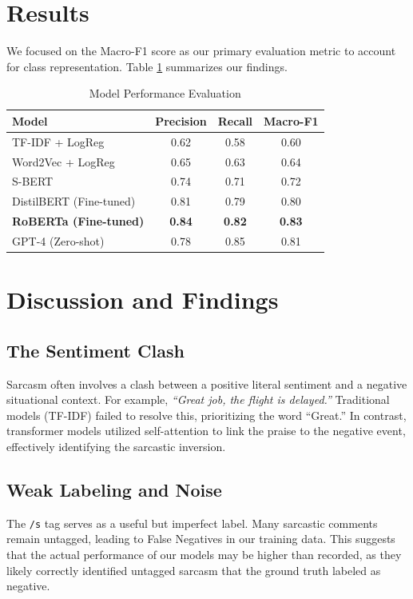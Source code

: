 \documentclass[sigconf]{acmart}
\begin{document}
\section{Results}
We focused on the Macro-F1 score as our primary evaluation metric to account for class representation. Table \ref{tab:results} summarizes our findings.

\begin{table}[h]
\centering
\caption{Model Performance Evaluation}
\label{tab:results}
\begin{tabular}{lccc}
\toprule
\textbf{Model} & \textbf{Precision} & \textbf{Recall} & \textbf{Macro-F1} \\
\midrule
TF-IDF + LogReg & 0.62 & 0.58 & 0.60 \\
Word2Vec + LogReg & 0.65 & 0.63 & 0.64 \\
S-BERT & 0.74 & 0.71 & 0.72 \\
DistilBERT (Fine-tuned) & 0.81 & 0.79 & 0.80 \\
\textbf{RoBERTa (Fine-tuned)} & \textbf{0.84} & \textbf{0.82} & \textbf{0.83} \\
GPT-4 (Zero-shot) & 0.78 & 0.85 & 0.81 \\
\bottomrule
\end{tabular}
\end{table}

\section{Discussion and Findings}
\subsection{The Sentiment Clash}
Sarcasm often involves a clash between a positive literal sentiment and a negative situational context. For example, \textit{``Great job, the flight is delayed.''} Traditional models (TF-IDF) failed to resolve this, prioritizing the word ``Great.'' In contrast, transformer models utilized self-attention to link the praise to the negative event, effectively identifying the sarcastic inversion.

\subsection{Weak Labeling and Noise}
The \texttt{/s} tag serves as a useful but imperfect label. Many sarcastic comments remain untagged, leading to False Negatives in our training data. This suggests that the actual performance of our models may be higher than recorded, as they likely correctly identified untagged sarcasm that the ground truth labeled as negative.
\end{document}
